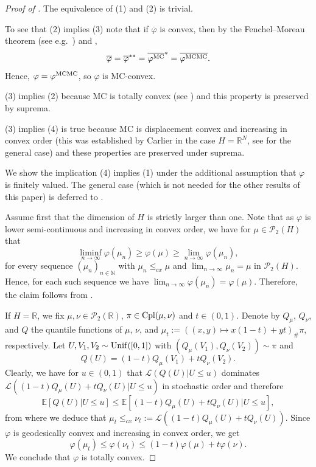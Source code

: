 \documentclass[a4paper]{amsart}
\numberwithin{theorem}{section}
\theoremstyle{definition}
\newcommand{\N}{\mathbb{N}}
\newcommand{\R}{\mathbb{R}}
\newcommand{\law}{\mathcal{L}}
\newcommand{\cpl}{\textup{Cpl}}
\newcommand{\Pc}{\mathcal P}
\renewcommand{\H}{H}
\renewcommand{\phi}{\varphi}
\newcommand{\mc}{\textup{MC}}
\begin{document}
\begin{proof}[Proof of ]
The equivalence of (1) and (2) is trivial.

To see that (2) implies (3) note that if $\overline{\phi}$ is convex, then by the Fenchel--Moreau theorem (see e.g.\ \cite[Theorem 13.32]{BaCo11}) and , 
\[
\overline{\phi} = \overline{\phi}^{\ast\ast} = \overline{\phi^{\mc}}^\ast = \overline{\phi^{\mc\mc}}.
\]
Hence, $\phi = \phi^{\mc\mc}$, so $\phi$ is MC-convex.

(3) implies (2) because MC is totally convex (see ) and this property is preserved by suprema.

(3) implies (4) is true because MC is displacement convex and increasing in convex order (this was established by Carlier \cite{Ca08} in the case $H=\R^N$, see  for the general case) and these properties are preserved under suprema.

We show the implication  (4) implies (1) under the additional assumption that $\phi$ is finitely valued. The general case (which is not needed for the other results of this paper) is deferred to \cite{BePaScSo25}.


Assume first that the dimension of $\H$ is strictly larger than one. Note that as $\phi$ is lower semi-continuous and increasing in convex order, we have for $\mu \in \Pc_2(\H)$ that
\[
    \liminf_{n \to \infty} \phi(\mu_n) \ge \phi(\mu) \ge \lim_{n \to \infty} \phi(\mu_n),
\]
for every sequence $(\mu_n)_{n \in \N}$ with $\mu_n \le_{cx} \mu$ and $\lim_{n \to \infty} \mu_n = \mu$ in $\Pc_2(\H)$.
Hence, for each such sequence we have $\lim_{n \to \infty} \phi(\mu_n) = \phi(\mu)$.
Therefore, the claim follows from \cite[Proof of Theorem~9.1]{CaSaSo25}.

If $\H = \R$, we fix $\mu,\nu \in \Pc_2(\R)$, $\pi \in \cpl(\mu,\nu)$ and $t \in (0,1)$.
Denote by $Q_\mu$, $Q_\nu$, and $Q$ the quantile functions of $\mu$, $\nu$, and $\mu_t := ((x,y) \mapsto x(1-t) + yt )_\# \pi$, respectively.
Let $U,V_1,V_2\sim {\rm Unif}([0,1])$ with $(Q_\mu(V_1), Q_\nu(V_2)) \sim \pi$ and 
\[
    Q(U) = (1-t) Q_\mu(V_1) + t Q_\nu(V_2).
\]
Clearly, we have for $u \in (0,1)$ that $\law(Q(U) | U \le u)$ dominates $\law((1-t)Q_\mu(U) + tQ_\nu(U)|U \le u)$ in stochastic order and therefore
\[
    \mathbb E[Q(U) | U \le u] \le
    \mathbb E[(1-t)Q_\mu(U) + t Q_\nu(U) | U \le u],
\]
from where we deduce that $\mu_t \le_{cx} \nu_t := \law( (1-t) Q_\mu(U) + t Q_\nu(U))$.
Since $\phi$ is geodesically convex and increasing in convex order, we get
\[
    \phi(\mu_t) \le \phi(\nu_t) \le (1-t)\phi(\mu) + t \phi(\nu).
\]
We conclude that $\phi$ is totally convex.
\end{proof}
\end{document}
